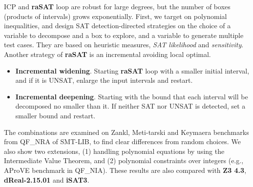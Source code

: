 \documentclass[runningheads,a4paper,oribibl]{llncs}
\newcommand{\suppress}[1]{} %
\begin{document}
ICP and {\bf raSAT} loop are robust for large degrees, but the number of boxes (products of intervals) 
grows exponentially. 
First, we target on polynomial inequalities, and design SAT detection-directed strategies on 
the choice of a variable to decompose and a box to explore, and a variable to generate multiple test cases. 
They are based on heuristic measures, {\em SAT likelihood} and {\em sensitivity}.
Another strategy of {\bf raSAT} is an incremental avoiding local optimal. 
\begin{itemize}
\item {\bf Incremental widening}. 
Starting {\bf raSAT} loop with a smaller initial interval, and if it is UNSAT, enlarge the input intervals
and restart. 
\item {\bf Incremental deepening}. 
Starting with the bound that each interval will be decomposed no smaller than it. 
If neither SAT nor UNSAT is detected, set a smaller bound and restart. 
\end{itemize} 
The combinations are examined on Zankl, Meti-tarski and Keymaera benchmarks from 
QF\_NRA of SMT-LIB, to find clear differences from random choices. 
We also show two extensions, (1) handling polynomial equations by using the Intermediate Value Theorem, 
and (2) polynomial constraints over integers (e.g., AProVE benchmark in QF\_NIA). 
These results are also compared with {\bf Z3 4.3}, \textbf{dReal-2.15.01} and {\bf iSAT3}. 

\suppress{
ICP is robust for larger degrees, but the number of boxes (products of intervals) to explore 
exponentially explodes when variables increase. 
Thus, design of strategies for selecting variables to decompose and boxes to explore is crucial 
for efficiency. Our strategy design is, 
\begin{itemize}
\item a box with more possibility to be SAT is selected to explore, which is estimated by 
several heuristic measures, called {\em SAT likelihood}, 
and the number of unsolved atomic polynomial constraints, and
\item a more influential variable is selected for multiple test cases and decomposition, 
which is estimated by {\em sensitivity}. 
\end{itemize} 
}
\end{document}
